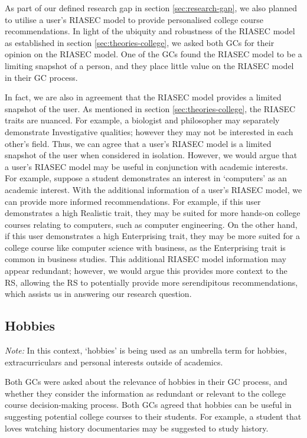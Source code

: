 As part of our defined research gap in section \ref{sec:research-gap}, 
we also planned to utilise a user's RIASEC model to provide personalised college course recommendations.
In light of the ubiquity and robustness of the RIASEC model as established in section \ref{sec:theories-college},
we asked both GCs for their opinion on the RIASEC model.
One of the GCs found the RIASEC model to be a limiting snapshot of a person,
and they place little value on the RIASEC model in their GC process.

In fact, we are also in agreement that the RIASEC model provides a limited snapshot of the user.
As mentioned in section \ref{sec:theories-college}, the RIASEC traits are nuanced.
For example, a biologist and philosopher may separately demonstrate Investigative qualities; however they may not be interested 
in each other's field.
Thus, we can agree that a user's RIASEC model is a limited snapshot of the user when considered in isolation.
However, we would argue that a user's RIASEC model may be useful in conjunction with academic interests.
For example, suppose a student demonstrates an interest in `computers' as an academic interest.
With the additional information of a user's RIASEC model, we can provide more informed recommendations.
For example, if this user demonstrates a high Realistic trait, they may be suited for more hands-on college courses
 relating to computers,
such as computer engineering.
On the other hand, if this user demonstrates a high Enterprising trait, they may be more suited for a college course like computer science with business,
as the Enterprising trait is common in business studies.
This additional RIASEC model information may appear redundant; however, we would argue this provides more context to the RS,
allowing the RS to potentially provide more serendipitous recommendations, 
which assists us in answering our research question.

\subsection{Hobbies}
\label{sec:hobbies}

\emph{Note:} In this context, `hobbies' is being used as an umbrella term for hobbies, extracurriculars and personal interests outside of academics.

Both GCs were asked about the relevance of hobbies in their GC process, and whether they consider the 
information as redundant or relevant to the college course decision-making process.
Both GCs agreed that hobbies can be useful in suggesting potential 
college courses to their students.
For example, a student that loves watching history documentaries may be suggested to study history.

